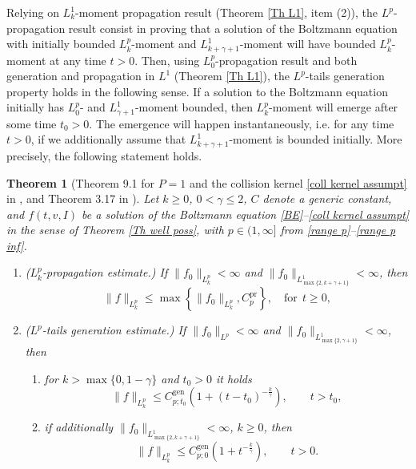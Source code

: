 \documentclass[11pt,a4paper]{amsart}
\newcommand{\g}{\gamma}
\newcommand{\Cpr}{C^{\text{pr}}}
\newtheorem{theorem}{Theorem}
\begin{document}
 
Relying on $L^1_k$-moment propagation result (Theorem \ref{Th L1}, item (2)), the $L^p$-propagation result consist in proving that a solution of the Boltzmann equation with initially bounded $L^p_k$-moment and $L^1_{k+\g+1}$-moment will have bounded $L^p_k$-moment  at any time $t>0$. Then, using  $L^p_0$-propagation result and both generation and propagation in $L^1$ (Theorem \ref{Th L1}), the $L^p$-tails ge\-ne\-ration property holds in the following sense.  If a solution  to the Boltzmann equation  initially has $L^p_0$- and $L^1_{\g+1}$-moment bounded, then $L^p_k$-moment will emerge after some time $t_0 > 0$. The emergence will happen instantaneously, i.e. for any time $t>0$, if we additionally assume that   $L^1_{k+\g+1}$-moment is  bounded initially. More precisely, the following statement holds.
\begin{theorem}[Theorem 9.1 for $P=1$ and the collision kernel \eqref{coll kernel assumpt} in \cite{MC-Alonso-Lp}, and Theorem 3.17 in \cite{MC-Alonso-Pesaro}]\label{Th prop Lp} 
 	Let  $k\geq0$, $0<\g\leq2$, $C$ denote a generic constant,  and   $f(t,v,I)$ be a solution of the Boltzmann  equation   	\eqref{BE}--\eqref{coll kernel assumpt} in the sense of Theorem \ref{Th well poss}, with $p \in (1,\infty]$ from \eqref{range p}--\eqref{range p inf}.
 	\begin{enumerate}
 			\item ($L^p_k$-propagation estimate.) If $\| f_0    \|_{L^p_{k}}< \infty$ and $\| f_0    \|_{L^1_{\max\{2, k+ \g +1\}}}< \infty$, then
	\begin{equation}\label{Lp propagation}
	\| f  \|_{L^p_{k}} \leq \max\left\{  \| f_0    \|_{L^p_{k}}, \Cpr_p \right\}, \quad \text{for} \ \ t\geq 0,
\end{equation}
 		\item ($L^p$-tails   generation estimate.)  If $\| f_0    \|_{L^p}< \infty$ and $\| f_0    \|_{L^1_{\max\{2, \g +1\}}}< \infty$, then
 		\begin{enumerate}
 			\item for $k>\max\{0,1-\g\}$ and $t_0>0$ it holds
 		\begin{equation}\label{Lp generation t0}
 			\| f \|_{L^p_k} \leq C^{\text{gen}}_{p; t_0} \left(1  +  (t-t_0)^{-\frac{k}{\g}} \right), \qquad  t>t_0,
 		\end{equation}
 	\item if additionally $\| f_0    \|_{L^1_{\max\{2, k+ \g +1\}}}< \infty$, $k\geq0$, then
 	 		\begin{equation}\label{Lp generation t}
 		\| f \|_{L^p_k} \leq C^{\text{gen}}_{p; 0}  \left(1  +  t^{-\frac{k}{\g}} \right), \qquad  t>0.
 	\end{equation}
 		\end{enumerate}
 	\end{enumerate}
\end{theorem}
\end{document}
